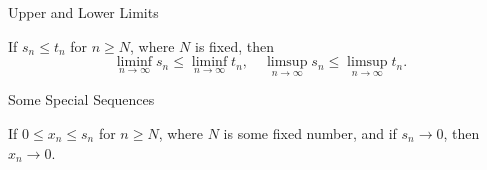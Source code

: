 \documentclass{beamer}
\begin{document}
\begin{frame}{Upper and Lower Limits} 

\begin{theorem}
If $s_n \leq t_n$ for $n \geq N$, where $N$ is fixed, then
\[
\liminf_{n \to \infty} s_n \leq \liminf_{n \to \infty} t_n, \quad
\limsup_{n \to \infty} s_n \leq \limsup_{n \to \infty} t_n.
\]
\end{theorem}
\end{frame}


\begin{frame}{Some Special Sequences}
  \begin{remark}
    If $0 \leq x_n \leq s_n$ for $n \geq N$, where $N$ is some fixed number, and
    if $s_n \to 0$, then $x_n \to 0$.
  \end{remark}
\end{frame}
\end{document}
